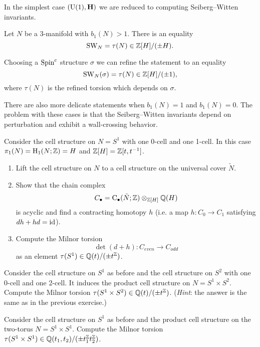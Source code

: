 In the simplest case $(\mathrm{U}(1), \mathbf{H})$ we are reduced to computing Seiberg--Witten invariants.

\begin{thm}
	Let $N$ be a 3-manifold with $b_1(N)>1$. There is an equality
	\[\mathrm{SW}_N = \tau(N)\in\mathbb{Z}[H]/(\pm H).\]
\end{thm}

\begin{remark}
	Choosing a $\mathrm{Spin}^c$ structure $\sigma$ we can refine the statement to an equality
	\[\mathrm{SW}_N(\sigma) = \tau(N)\in\mathbb{Z}[H]/(\pm 1),\]
	where $\tau(N)$ is the refined torsion which depends on $\sigma$.
\end{remark}

\begin{remark}
	There are also more delicate statements when $b_1(N) = 1$ and $b_1(N)=0$. The problem with these cases is that the Seiberg--Witten invariants depend on perturbation and exhibit a wall-crossing behavior.
\end{remark}

\begin{exercise}
	Consider the cell structure on $N=S^1$ with one 0-cell and one 1-cell. In this case $\pi_1(N)=\mathrm{H}_1(N;\mathbb{Z})=H$ and $\mathbb{Z}[H]=\mathbb{Z}[t, t^{-1}]$.
	\begin{enumerate}
		\item Lift the cell structure on $N$ to a cell structure on the universal cover $\tilde{N}$.
		\item Show that the chain complex
		\[C_\bullet = \mathrm{C}_\bullet(\tilde{N}; \mathbb{Z})\otimes_{\mathbb{Z}[H]}\mathbb{Q}(H)\]
		is acyclic and find a contracting homotopy $h$ (i.e. a map $h\colon C_0\rightarrow C_1$ satisfying $dh + hd = \mathrm{id}$).
		\item Compute the Milnor torsion
		\[\det(d + h)\colon C_{even}\longrightarrow C_{odd}\]
		as an element $\tau(S^1)\in\mathbb{Q}(t)/(\pm t^{\mathbb{Z}})$.
	\end{enumerate}
\end{exercise}

\begin{exercise}
	Consider the cell structure on $S^1$ as before and the cell structure on $S^2$ with one 0-cell and one 2-cell. It induces the product cell structure on $N=S^1\times S^2$. Compute the Milnor torsion $\tau(S^1\times S^2)\in\mathbb{Q}(t)/(\pm t^{\mathbb{Z}})$. (\emph{Hint}: the answer is the same as in the previous exercise.)
\end{exercise}

\begin{exercise}
	Consider the cell structure on $S^1$ as before and the product cell structure on the two-torus $N=S^1\times S^1$. Compute the Milnor torsion $\tau(S^1\times S^1)\in\mathbb{Q}(t_1, t_2)/(\pm t_1^{\mathbb{Z}} t_2^{\mathbb{Z}})$.
\end{exercise}
 
